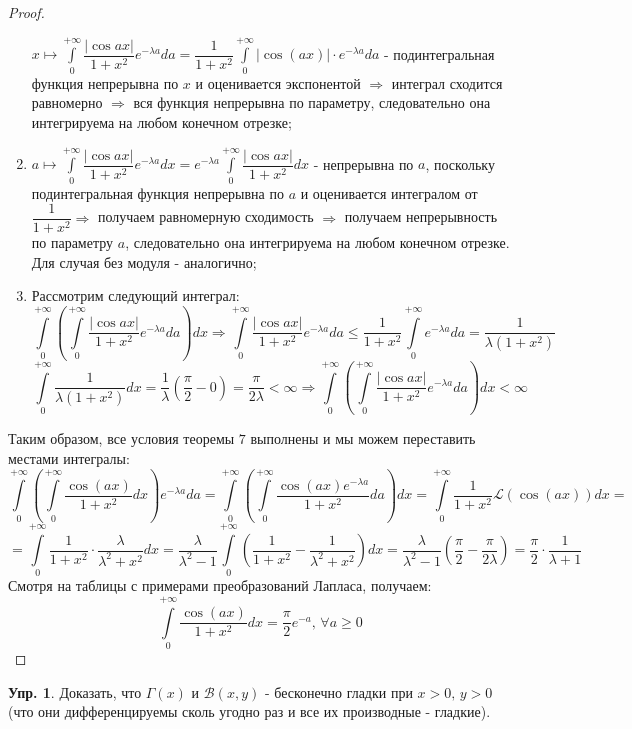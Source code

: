 \documentclass[12pt]{article}
\newcommand{\MB}{\mathcal{B}}
\newcommand{\ML}{\mathcal{L}}
\theoremstyle{definition}
\newtheorem{exrc}{Упр.}
\newcommand{\ddint}[2]{\displaystyle\int\limits_{#1}^{#2}}
\begin{document}
\begin{proof}
\begin{enumerate}[label=(\arabic*)]
		$x \mapsto \ddint{0}{+\infty}\dfrac{|\cos{ax}|}{1 + x^2}e^{-\lambda a}da = \dfrac{1}{1 + x^2}\ddint{0}{+\infty}|\cos{(ax)}|{\cdot}e^{-\lambda a}da$ - подинтегральная функция непрерывна по $x$ и оценивается экспонентой $\Rightarrow$ интеграл сходится равномерно $\Rightarrow$ вся функция непрерывна по параметру, следовательно она интегрируема на любом конечном отрезке; 
		\item $a \mapsto \ddint{0}{+\infty}\dfrac{|\cos{ax}|}{1 + x^2}e^{-\lambda a}dx = e^{-\lambda a}\ddint{0}{+\infty}\dfrac{|\cos{ax}|}{1 + x^2}dx$ - непрерывна по $a$, поскольку подинтегральная функция непрерывна по $a$ и оценивается интегралом от $\dfrac{1}{1+x^2} \Rightarrow$ получаем равномерную сходимость $\Rightarrow$ получаем непрерывность по параметру $a$, следовательно она интегрируема на любом конечном отрезке. Для случая без модуля - аналогично;
		\item Рассмотрим следующий интеграл:
		$$
			\ddint{0}{+\infty}\left(\ddint{0}{+\infty}\dfrac{|\cos{ax}|}{1 + x^2} e^{-\lambda a}da\right)dx \Rightarrow \ddint{0}{+\infty}\dfrac{|\cos{ax}|}{1 + x^2} e^{-\lambda a}da \leq \dfrac{1}{1 + x^2}\ddint{0}{+\infty}e^{-\lambda a}da = \dfrac{1}{\lambda(1+x^2)} 
		$$
		$$
			\ddint{0}{+\infty}\dfrac{1}{\lambda(1+x^2)} dx = \dfrac{1}{\lambda}\left(\dfrac{\pi}{2} - 0\right) = \dfrac{\pi}{2\lambda} < \infty \Rightarrow \ddint{0}{+\infty}\left(\ddint{0}{+\infty}\dfrac{|\cos{ax}|}{1 + x^2} e^{-\lambda a}da\right)dx < \infty
		$$
	\end{enumerate}	
	Таким образом, все условия теоремы $7$ выполнены и мы можем переставить местами интегралы:
	$$
		\ddint{0}{+\infty}\left(\ddint{0}{+\infty}\dfrac{\cos{(ax)}}{1 + x^2}dx\right)e^{-\lambda a}da = \ddint{0}{+\infty}\left(\ddint{0}{+\infty}\dfrac{\cos{(ax)}e^{-\lambda a}}{1 + x^2}da\right)dx = \ddint{0}{+\infty}\dfrac{1}{1 + x^2}\ML(\cos{(ax)})dx = 
	$$
	$$	
		= \ddint{0}{+\infty}\dfrac{1}{1+x^2}{\cdot}\dfrac{\lambda}{\lambda^2 + x^2}dx = \dfrac{\lambda}{\lambda^2 - 1} \ddint{0}{+\infty}\left(\dfrac{1}{1+ x^2} - \dfrac{1}{\lambda^2 + x^2}\right)dx = \dfrac{\lambda}{\lambda^2 - 1}\left(\dfrac{\pi}{2} - \dfrac{\pi}{2\lambda}\right) = \dfrac{\pi}{2}{\cdot}\dfrac{1}{\lambda + 1}
	$$
	Смотря на таблицы с примерами преобразований Лапласа, получаем:
	$$
		\ddint{0}{+\infty}\dfrac{\cos{(ax)}}{1+ x^2}dx = \dfrac{\pi}{2}e^{-a}, \, \forall a \geq 0
	$$
\end{proof}
\begin{exrc}
	Доказать, что $\Gamma(x)$ и $\MB(x,y)$ - бесконечно гладки при $x > 0, \, y > 0$ (что они дифференцируемы сколь угодно раз и все их производные  - гладкие).
\end{exrc}
\end{document}
